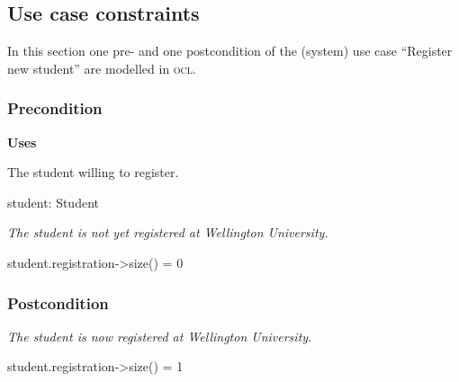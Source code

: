\subsection{Use case constraints}

\npar In this section one pre- and one postcondition of the (system) use case
``Register new student'' are modelled in \textsc{ocl}.

\subsubsection{Precondition}

\par \hspace*{5 mm} \textbf{Uses}
\par \hspace*{10 mm} The student willing to register.
\par \hspace*{13 mm} student: Student

\npar \hspace*{5 mm} \emph{The student is not yet registered at Wellington
University.} \par \hspace*{10 mm} student.registration->size() = 0

\subsubsection{Postcondition}

\par \hspace*{5 mm} \emph{The student is now registered at Wellington
University.}
\par \hspace*{10 mm} student.registration->size() = 1
